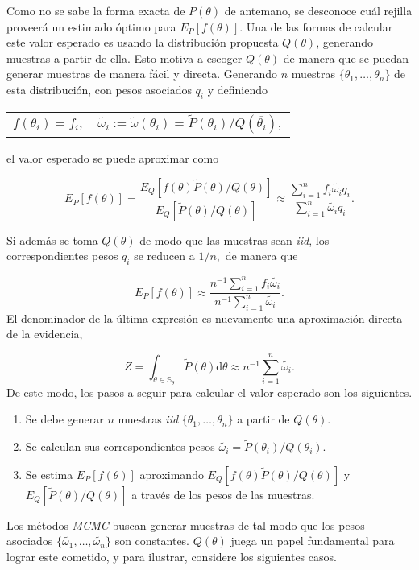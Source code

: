 	Como no se sabe la forma exacta de $P(\theta)$ de antemano, se desconoce cuál rejilla proveerá un estimado óptimo para $E_P[f(\theta)]$. Una de las formas de calcular este valor esperado es usando la distribución propuesta $Q(\theta)$, generando muestras a partir de ella. Esto motiva a escoger $Q(\theta)$ de manera que se puedan generar muestras de manera fácil y directa. Generando $n$ muestras $\{\theta_1,\dots,\theta_n\}$ de esta distribución, con pesos asociados $q_i$ y definiendo
	\begin{center}
	\begin{tabular}{cc}
	$f(\theta_i)=f_i,$& $\tilde{\omega_i}:=\tilde{\omega}(\theta_i)=\tilde{P}(\theta_i)/Q(\overline{\theta_i}),$
	\end{tabular}
	\end{center}
	
	el valor esperado se puede aproximar como
	
	$$E_P[f(\theta)]=\frac{E_Q[f(\theta)\tilde{P}(\theta)/Q(\theta)]}{E_Q[\tilde{P}(\theta)/Q(\theta)]}\approx \frac{\sum_{i=1}^n f_i\tilde{\omega_i}q_i}{\sum_{i=1}^n \tilde{\omega_i}q_i}.$$
	
	Si además se toma $Q(\theta)$ de modo que las muestras sean \textit{iid}, los correspondientes pesos $q_i$ se reducen a $1/n,$ de manera que
	
	$$E_P[f(\theta)]\approx \frac{n^{-1}\sum_{i=1}^n f_i\tilde{\omega_i}}{n^{-1}\sum_{i=1}^n \tilde{\omega_i}}.$$
	El denominador de la última expresión es nuevamente una aproximación directa de la evidencia,
	
	$$Z=\int_{\theta\in\mathbb{S}_\theta} \tilde{P}(\theta)\mathrm{d}\theta\approx n^{-1}\sum_{i=1}^n \tilde{\omega_i}.$$
	De este modo, los pasos a seguir para calcular el valor esperado son los siguientes.
	\begin{enumerate}
		\item Se debe generar $n$ muestras \textit{iid} $\{\theta_1,\dots,\theta_n\}$ a partir de $Q(\theta)$.
		\item Se calculan sus correspondientes pesos $\tilde{\omega_i}=\tilde{P}(\theta_i)/Q(\theta_i).$
		\item Se estima $E_P[f(\theta)]$ aproximando $E_Q[f(\theta)\tilde{P}(\theta)/Q(\theta)]$ y $E_Q[\tilde{P}(\theta)/Q(\theta)]$ a través de los pesos de las muestras.
	\end{enumerate}
	Los métodos \textit{MCMC} buscan generar muestras de tal modo que los pesos asociados $\{\tilde{\omega_1},\dots, \tilde{\omega_n}\}$ son constantes. $Q(\theta)$ juega un papel fundamental para lograr este cometido, y para ilustrar, considere los siguientes casos.
	
